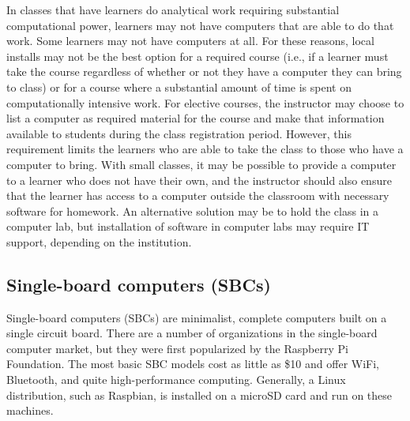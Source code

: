 In classes that have learners do analytical work requiring substantial computational power, learners may not have computers that are able to do that work. Some learners may not have computers at all. For these reasons, local installs may not be the best option for a required course (i.e., if a learner must take the course regardless of whether or not they have a computer they can bring to class) or for a course where a substantial amount of time is spent on computationally intensive work. For elective courses, the instructor may choose to list a computer as required material for the course and make that information available to students during the class registration period. However, this requirement limits the learners who are able to take the class to those who have a computer to bring. With small classes, it may be possible to provide a computer to a learner who does not have their own, and the instructor should also ensure that the learner has access to a computer outside the classroom with necessary software for homework. An alternative solution may be to hold the class in a computer lab, but installation of software in computer labs may require IT support, depending on the institution.

\subsection{Single-board computers (SBCs)}\label{sbc}


Single-board computers (SBCs) are minimalist, complete computers built on a
single circuit board.
There are a number of organizations in the single-board computer market, but
they were first popularized by the Raspberry Pi Foundation.
The most basic SBC models cost as little as \$10 and offer WiFi, Bluetooth,
and quite high-performance computing.
Generally, a Linux distribution, such as Raspbian, is installed
on a microSD card and run on these machines.


